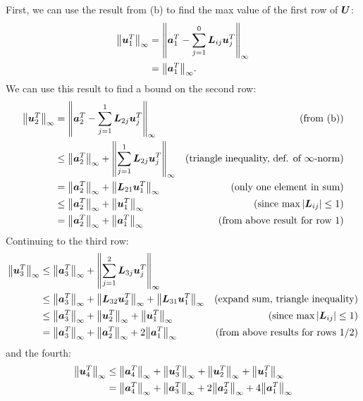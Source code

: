 \documentclass[twoside,10pt]{article}
\begin{document}
First, we can use the result from (b) to find the max value of the first row of $\bm{U}$:
\begin{align*}
  \left\|\vct{u}_1^T\right\|_{\infty} &= \left\|\mtx{a}^T_{1} - \sum_{j=1}^{0} \mtx{L}_{ij}\mtx{u}^T_{j}\right\|_{\infty}\\
  &= \left\|\vct{a}_1^T\right\|_{\infty}.
\end{align*}
We can use this result to find a bound on the second row:
\begin{align*}
  \left\|\vct{u}_2^T\right\|_{\infty} &= \left\|\mtx{a}^T_{2} - \sum_{j=1}^{1} \mtx{L}_{2j}\mtx{u}^T_{j}\right\|_{\infty}&\text{(from (b))}\\
  &\leq \left\|\mtx{a}^T_{2}\right\|_{\infty} + \left\|\sum_{j=1}^{1} \mtx{L}_{2j}\mtx{u}^T_{j}\right\|_{\infty}&\text{(triangle inequality, def. of $\infty$-norm)}\\
  &= \left\|\mtx{a}^T_{2}\right\|_{\infty} + \left\|\mtx{L}_{21}\mtx{u}^T_{1}\right\|_{\infty}&\text{(only one element in sum)}\\
  &\leq \left\|\mtx{a}^T_{2}\right\|_{\infty} + \left\|\mtx{u}^T_{1}\right\|_{\infty}&\text{(since $\max{\left|\mtx{L}_{ij}\right|} \leq 1$)}\\
  &= \left\|\mtx{a}^T_{2}\right\|_{\infty} + \left\|\mtx{a}^T_{1}\right\|_{\infty}&\text{(from above result for row 1)}\\
\end{align*}
Continuing to the third row:
\begin{align*}
  \left\|\vct{u}_3^T\right\|_{\infty} &\leq \left\|\mtx{a}^T_{3}\right\|_{\infty} + \left\|\sum_{j=1}^{2} \mtx{L}_{3j}\mtx{u}^T_{j}\right\|_{\infty}\\
  &\leq \left\|\mtx{a}^T_{3}\right\|_{\infty} + \left\|\mtx{L}_{32}\mtx{u}^T_{2}\right\|_{\infty} + \left\|\mtx{L}_{31}\mtx{u}^T_{1}\right\|_{\infty}&\text{(expand sum, triangle inequality)}\\
  &\leq \left\|\mtx{a}^T_{3}\right\|_{\infty} + \left\|\mtx{u}^T_{2}\right\|_{\infty} + \left\|\mtx{u}^T_{1}\right\|_{\infty} &\text{(since $\max{\left|\mtx{L}_{ij}\right|} \leq 1$)}\\
  &= \left\|\mtx{a}^T_{3}\right\|_{\infty} + \left\|\mtx{a}^T_{2}\right\|_{\infty} + 2\left\|\mtx{a}^T_{1}\right\|_{\infty}&\text{(from above results for rows 1/2)}\\
\end{align*}
and the fourth:
\begin{align*}
  \left\|\vct{u}_4^T\right\|_{\infty} &\leq \left\|\mtx{a}^T_{4}\right\|_{\infty} + \left\|\mtx{u}^T_{3}\right\|_{\infty} + \left\|\mtx{u}^T_{2}\right\|_{\infty} + \left\|\mtx{u}^T_{1}\right\|_{\infty}\\
  &=\left\|\mtx{a}^T_{4}\right\|_{\infty} + \left\|\mtx{a}^T_{3}\right\|_{\infty} + 2\left\|\mtx{a}^T_{2}\right\|_{\infty} + 4\left\|\mtx{a}^T_{1}\right\|_{\infty}\\
\end{align*}
\end{document}
